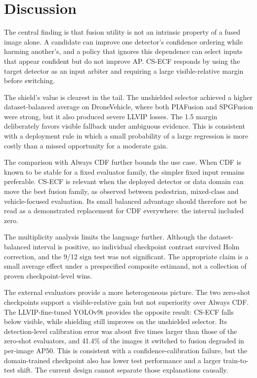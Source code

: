 \documentclass[preprint,11pt]{elsarticle}
\begin{document}
\section{Discussion}

The central finding is that fusion utility is not an intrinsic property of a
fused image alone. A candidate can improve one detector's confidence ordering
while harming another's, and a policy that ignores this dependence can select
inputs that appear confident but do not improve AP. CS-ECF responds by using
the target detector as an input arbiter and requiring a large visible-relative
margin before switching.

The shield's value is clearest in the tail. The unshielded selector achieved a
higher dataset-balanced average on DroneVehicle, where both PIAFusion and
SPGFusion were strong, but it also produced severe LLVIP losses. The 1.5 margin
deliberately favors visible fallback under ambiguous evidence. This is
consistent with a deployment rule in which a small probability of a large
regression is more costly than a missed opportunity for a moderate gain.

The comparison with Always CDF further bounds the use case. When CDF is known
to be stable for a fixed evaluator family, the simpler fixed input remains
preferable. CS-ECF is relevant when the deployed detector or data domain can
move the best fusion family, as observed between pedestrian, mixed-class and
vehicle-focused evaluation. Its small balanced advantage should therefore not
be read as a demonstrated replacement for CDF everywhere: the interval
included zero.

The multiplicity analysis limits the language further. Although the
dataset-balanced interval is positive, no individual checkpoint contrast
survived Holm correction, and the 9/12 sign test was not significant. The
appropriate claim is a small average effect under a prespecified composite
estimand, not a collection of proven checkpoint-level wins.

The external evaluators provide a more heterogeneous picture. The two zero-shot
checkpoints support a visible-relative gain but not superiority over Always CDF.
The LLVIP-fine-tuned YOLOv9t provides the opposite result: CS-ECF falls below
visible, while shielding still improves on the unshielded selector. Its
detection-level calibration error was about five times larger than those of
the zero-shot evaluators, and 41.4\% of the images it switched to fusion
degraded in per-image AP50. This is consistent with a confidence-calibration
failure, but the domain-trained checkpoint also has lower test performance and
a larger train-to-test shift. The current design cannot separate those
explanations causally.
\end{document}

